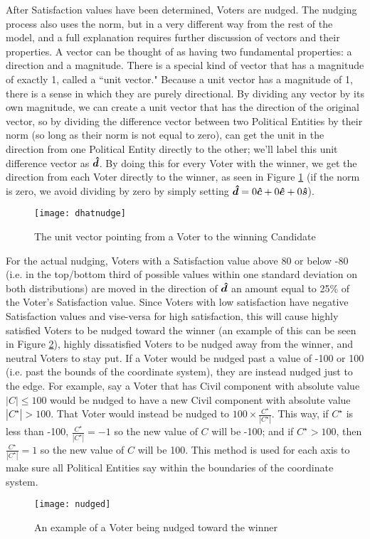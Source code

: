 \documentclass[12pt]{article}
\newcommand{\civ}{\vhat{c}}
\newcommand{\econ}{\vhat{e}}
\newcommand{\soc}{\vhat{s}}
\begin{document}
\qquad After Satisfaction values have been determined, Voters are nudged. The nudging process also uses the norm, but in a very different way from the rest of the model, and a full explanation requires further discussion of vectors and their properties. A vector can be thought of as having two fundamental properties: a direction and a magnitude. There is a special kind of vector that has a magnitude of exactly 1, called a ``unit vector." Because a unit vector has a magnitude of 1, there is a sense in which they are purely directional. By dividing any vector by its own magnitude, we can create a unit vector that has the direction of the original vector, so by dividing the difference vector between two Political Entities by their norm (so long as their norm is not equal to zero), can get the unit in the direction from one Political Entity directly to the other; we'll label this unit difference vector as $\bm{\hat{d}}$. By doing this for every Voter with the winner, we get the direction from each Voter directly to the winner, as seen in Figure \ref{exUnitVectors} (if the norm is zero, we avoid dividing by zero by simply setting $\vhat{d} = 0\civ + 0\econ + 0\soc$).
\begin{figure}[H]
\centering
\texttt{[image: dhatnudge]}
\caption{\footnotesize The unit vector pointing from a Voter to the winning Candidate}
\label{exUnitVectors}
\end{figure}

\qquad For the actual nudging, Voters with a Satisfaction value above 80 or below -80 (i.e. in the top/bottom third of possible values within one standard deviation on both distributions) are moved in the direction of $\bm{\hat{d}}$ an amount equal to 25\% of the Voter's Satisfaction value. Since Voters with low satisfaction have negative Satisfaction values and vise-versa for high satisfaction, this will cause highly satisfied Voters to be nudged toward the winner (an example of this can be seen in Figure \ref{exNudge}), highly dissatisfied Voters to be nudged away from the winner, and neutral Voters to stay put. If a Voter would be nudged past a value of -100 or 100 (i.e. past the bounds of the coordinate system), they are instead nudged just to the edge. For example, say a Voter that has Civil component with absolute value $\left|C\right| \le 100$ would be nudged to have a new Civil component with absolute value $\left|C^\star\right| > 100$. That Voter would instead be nudged to $100 \times \frac{C^\star}{\left|C^\star\right|}$. This way, if $C^\star$ is less than -100, $\frac{C^\star}{\left|C^\star\right|} = -1$ so the new value of $C$ will be -100; and if $C^\star > 100$, then $\frac{C^\star}{\left|C^\star\right|} = 1$ so the new value of $C$ will be 100. This method is used for each axis to make sure all Political Entities say within the boundaries of the coordinate system.
\begin{figure}[H]
\centering
\texttt{[image: nudged]}
\caption{\footnotesize An example of a Voter being nudged toward the winner}
\label{exNudge}
\end{figure}
\end{document}
